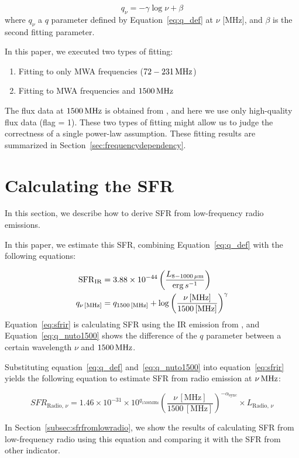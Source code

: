 \begin{equation}\label{eq:q_fitting}
    q_{\nu} = -\gamma\log{\nu} + \beta
\end{equation}
where $q_{\nu}$ a $q$ parameter defined by Equation~\ref{eq:q_def} at $\nu$ [MHz], and $\beta$ is the second fitting parameter.

In this paper, we executed two types of fitting:

\begin{enumerate}
    \item Fitting to only MWA frequencies ($72-231\,\mathrm{MHz}$)
    \item Fitting to MWA frequencies and $1500\,\mathrm{MHz}$
\end{enumerate}

The flux data at $1500\,\mathrm{MHz}$ is obtained from \citet{Boselli2015}, and here we use only high-quality flux data (flag = 1).
These two types of fitting might allow us to judge the correctness of a single power-law assumption.
These fitting results are summarized in Section~\ref{sec:frequencydependency}.



\section{Calculating the SFR}\label{subsec:calculatingsfr}
In this section, we describe how to derive SFR from low-frequency radio emissions.

In this paper, we estimate this SFR, combining Equation~\ref{eq:q_def} with the following equations:

\begin{align}
    \mathrm{SFR}_{\mathrm{IR}} &= 3.88 \times 10^{-44}\left(\frac{L_{\mathrm{8-1000\,\mu m}}}{\mathrm{erg}\,s^{-1}}\right)\label{eq:sfrir}\\
    q_{\nu\,[\mathrm{MHz}]} &= q_{1500\,[\mathrm{MHz}]} + \log{\left(\frac{\nu\,[\mathrm{MHz}]}{1500\,[\mathrm{MHz}]}\right)}^{\gamma}\label{eq:q_nuto1500}
\end{align}
Equation~\ref{eq:sfrir} is calculating SFR using the IR emission from \citet{Murphy2011}, and Equation~\ref{eq:q_nuto1500} shows the difference of the $q$ parameter between a certain wavelength $\nu$ and $1500\,\mathrm{MHz}$.

Substituting equation~\ref{eq:q_def} and~\ref{eq:q_nuto1500} into equation~\ref{eq:sfrir} yields the following equation to estimate SFR from radio emission at $\nu\,\mathrm{MHz}$:

\begin{equation}\label{eq:sfrfromradio}
    SFR_{\mathrm{Radio},\,\nu} = 1.46\times10^{-31}\times 10^{q_{1500\mathrm{MHz}}} {\left(\frac{\nu\,[\mathrm{MHz}]}{1500\,[\mathrm{MHz}]}\right)}^{-\alpha_{\mathrm{sync}}} \times L_{\mathrm{Radio},\,\nu}
\end{equation}

In Section~\ref{subsec:sfrfromlowradio}, we show the results of calculating SFR from low-frequency radio using this equation and comparing it with the SFR from other indicator.





